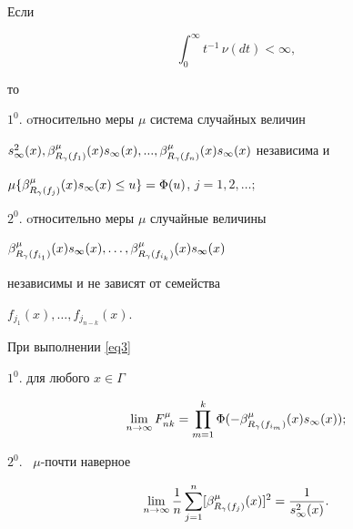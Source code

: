 \begin{thm}


Если


\begin{equation}\label{eq3}


\int_0^\infty t^{-1}\,\nu(dt)<\infty,


\end{equation}


то





$1^0$. oтносительно меры $\mu$ система случайных величин


$\stwo,\beta^{\mu}_{R_\gamma(f_1)}(x)\s,...,


\beta^{\mu}_{R_\gamma(f_n)}(x)\s$ независима и


$\mu\{\beta^{\mu}_{R_\gamma(f_j)}(x)\s\le u\}=


\Phi(u)$, $j=1,2,\dotsc;$





$2^0$. oтносительно меры $\mu$ случайные величины


$\beta^{\mu}_{R_\gamma(f_{i_1})}(x)\s,\dotsc,


\beta^{\mu}_{R_\gamma(f_{i_k})}(x)\s$


независимы и не зависят от семейства


$f_{j_1}(x),\dotsc,f_{j_{n-k}}(x)$.


\end{thm}








\begin{thm}


При выполнении \eqref{eq3}





$1^0$. для любого $x\in\Gamma$


$$


\lim_{n\to\infty}F^{\mu}_{nk}=


\prod_{m=1}^k\Phi(-\beta^{\mu}_{R_\gamma(f_{i_m})}(x)\s);


$$





$2^0$. \ $\mu$-почти наверное


$$


\lim_{n\to\infty}\frac1n\sum_{j=1}^n


[\beta^{\mu}_{R_\gamma(f_j)}(x)]^2=\frac1{\stwo}.


$$


\end{thm}








